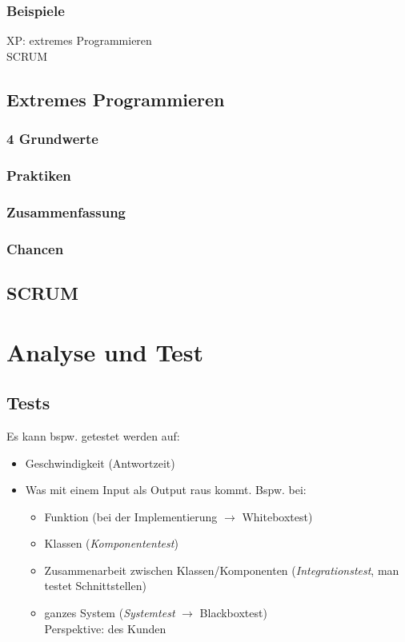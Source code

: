 \documentclass{scrreprt}
\begin{document}
\subsection{Beispiele}
XP: extremes Programmieren\\
SCRUM

\section{Extremes Programmieren}

\subsection{4 Grundwerte}

\subsection{Praktiken}

\subsection{Zusammenfassung}

\subsection{Chancen}

\section{SCRUM}

\chapter{Analyse und Test}
\section{Tests}
Es kann bspw. getestet werden auf:
\begin{itemize}
\item Geschwindigkeit (Antwortzeit)
\item Was mit einem Input als Output raus kommt. Bspw. bei:
\begin{itemize}
\item Funktion (bei der Implementierung $\to$ Whiteboxtest)
\item Klassen (\emph{Komponententest})
\item Zusammenarbeit zwischen Klassen/Komponenten (\emph{Integrationstest}, man testet Schnittstellen)
\item ganzes System (\emph{Systemtest} $\to$ Blackboxtest)\\
Perspektive: des Kunden
\end{itemize}
\end{itemize}
\end{document}
